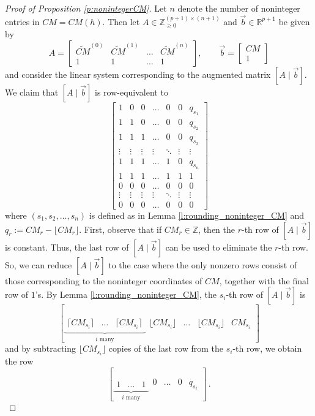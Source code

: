 \documentclass[12pt]{amsart}
\theoremstyle{definition}
\numberwithin{equation}{section}
\renewcommand\>{\rangle}
\newcommand\<{\langle}
\newcommand\0{\mathbf{0}}
\newcommand\RR{\mathbb{R}}
\newcommand\ZZ{\mathbb{Z}}
\begin{document}
\begin{proof}[Proof of Proposition \ref{p:nonintegerCM}]
	Let $n$ denote the number of noninteger entries in $CM=CM(h)$. 
	Then let $A \in \ZZ_{\geq 0}^{(p+1) \times (n+1)}$ and $\vec b \in \RR^{p+1}$ be given by
	\[A = \begin{bmatrix}
		\widetilde{CM}^{(0)} & \widetilde{CM}^{(1)} & \dots & \widetilde{CM}^{(n)} \\
		1 & 1 & \dots & 1
	\end{bmatrix}, \qquad \vec b = \begin{bmatrix}
		CM \\ 1
	\end{bmatrix} \]
	and consider the linear system corresponding to the augmented matrix $[A \mid \vec{b}]$. We claim that $[A \mid \vec{b}]$ is row-equivalent to
	\[\left[\begin{array}{cccccc|c}
		1 & 0 & 0 & \dots & 0 & 0 & q_{s_1}\\
		1 & 1 & 0 & \dots & 0 & 0 & q_{s_2}\\
		1 & 1 & 1 & \dots & 0 & 0 & q_{s_3}\\
		\vdots & \vdots & \vdots & \vdots & \ddots & \vdots & \vdots\\
		1 & 1 & 1 & \dots & 1 & 0 & q_{s_{n}}\\
		1 & 1 & 1 & \dots & 1 & 1 & 1\\
		0 & 0 & 0 & \dots & 0 & 0 & 0 \\
		\vdots & \vdots & \vdots & \vdots & \ddots & \vdots & \vdots\\
		0 & 0 & 0 & \dots & 0 & 0 & 0
	\end{array}\right]\]
	where $(s_1, s_2, \dots, s_n)$ is defined as in Lemma \ref{l:rounding_noninteger_CM} and $q_r := CM_{r} - \lfloor CM_{r} \rfloor$. 
	First, observe that if $CM_r \in \ZZ$, then the $r$-th row of $[A \mid \vec{b}]$ is constant. 
	Thus, the last row of $[A \mid \vec{b}]$ can be used to eliminate the $r$-th row. 
	So, we can reduce $[A \mid \vec{b}]$ to the case where the only nonzero rows consist of those corresponding to the noninteger coordinates of $CM$, together with the final row of $1$'s. 
	By Lemma \ref{l:rounding_noninteger_CM}, the $s_i$-th row of $[A \mid \vec b]$ is 
	\[
	[
	\underbrace{
		\begin{array}{ccc}
			\lceil CM_{s_i} \rceil & \dots & \lceil CM_{s_i} \rceil 
		\end{array}
	}_{i \text{ many}}
	\begin{array}{ccc|c}
		\lfloor CM_{s_i} \rfloor & \dots & \lfloor CM_{s_i} \rfloor & CM_{s_i}
	\end{array}
	]
	\]
	and by subtracting $\lfloor CM_{s_i} \rfloor$ copies of the last row from the $s_i$-th row, we obtain the row
	\[
	[
	\underbrace{
		\begin{array}{ccc}
			1 & \dots & 1 
		\end{array}
	}_{i \text{ many}}
	\begin{array}{ccc|c}
		0 & \dots & 0 & q_{s_i}
	\end{array}
	] \, .
	\]
	

\end{proof}
\end{document}
